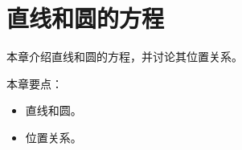 \chapter{直线和圆的方程}

本章介绍直线和圆的方程，并讨论其位置关系。

本章要点：
\begin{itemize}
    \item 直线和圆。
    \item 位置关系。
\end{itemize}

\newpage


\newpage


\newpage


\newpage


\newpage


\newpage





